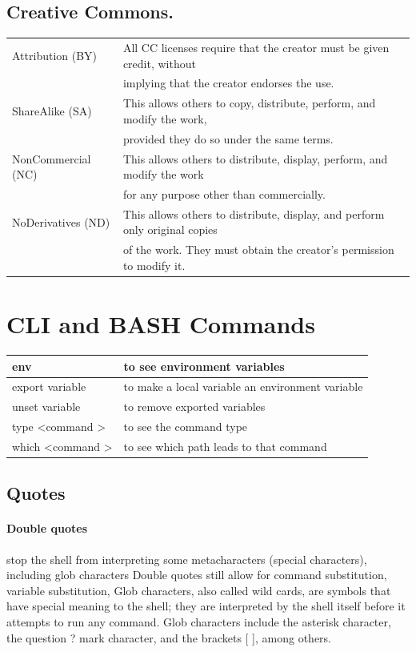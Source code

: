 \documentclass[10pt]{article}
\begin{document}
\subsection{Creative Commons.}
\begin{center}
	\begin{tabular}{|l|l|}
		\hline
		Attribution (BY) & All CC licenses require that the creator must be given credit, without \\
						 & implying that the creator endorses the use. \\
						 \hline
		ShareAlike (SA)	 & This allows others to copy, distribute, perform, and modify the work,  \\
						 & provided they do so under the same terms.  \\
						 \hline
		NonCommercial (NC) & This allows others to distribute, display, perform, and modify the work  \\
						   & for any purpose other than commercially. \\
						   \hline
		NoDerivatives (ND) & This allows others to distribute, display, and perform only original copies  \\
						   & of the work. They must obtain the creator’s permission to modify it. \\
						   \hline
	\end{tabular}
\end{center}
\section{CLI and BASH Commands}

\begin{tabular}{|l|l|}

	\hline env				&	to see environment variables\\
	\hline export variable	&	to make a local variable an environment  variable\\
	\hline unset variable	&	to remove exported variables\\
	\hline type \textless command \textgreater	&	to see the command type\\
	\hline which \textless command \textgreater	&	to see which path leads to that command\\
	\hline
\end{tabular}
\subsection{Quotes}
\paragraph{Double quotes} stop the shell from interpreting some metacharacters (special characters), including glob characters
Double quotes still allow for command substitution, variable substitution,
Glob characters, also called wild cards, are symbols that have special meaning to the shell; they are interpreted by the shell
itself before it attempts to run any command. Glob characters include the asterisk \textasteriskcentered   character, the question ? mark character,
and the brackets [ ], among others.
\end{document}
